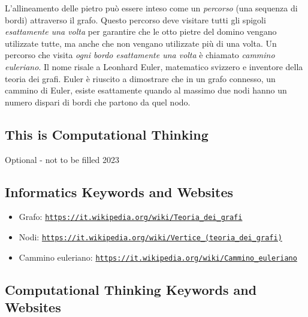 \documentclass[a4paper,11pt]{report}
\newcommand{\BrochureUrlText}[1]{\texttt{#1}}
\begin{document}
L’allineamento delle pietro può essere inteso come un \emph{percorso} (una sequenza di bordi) attraverso il grafo. Questo percorso deve visitare tutti gli spigoli \emph{esattamente una volta} per garantire che le otto pietre del domino vengano utilizzate tutte, ma anche che non vengano utilizzate più di una volta.  Un percorso che visita \emph{ogni bordo esattamente una volta} è chiamato \emph{cammino euleriano}. Il nome risale a Leonhard Euler, matematico svizzero e inventore della teoria dei grafi. Euler  è riuscito a dimostrare che in un grafo connesso, un cammino di Euler, esiste esattamente quando al massimo due nodi hanno un numero dispari di bordi che partono da quel nodo.


\subsection*{This is Computational Thinking}

Optional - not to be filled 2023


\subsection*{Informatics Keywords and Websites}

\begin{itemize}
  \item Grafo: \href{https://it.wikipedia.org/wiki/Teoria_dei_grafi}{\BrochureUrlText{https://it.wikipedia.org/wiki/Teoria\_dei\_grafi}}
  \item Nodi: \href{https://it.wikipedia.org/wiki/Vertice_(teoria_dei_grafi)}{\BrochureUrlText{https://it.wikipedia.org/wiki/Vertice\_(teoria\_dei\_grafi)}}
  \item Cammino euleriano: \href{https://it.wikipedia.org/wiki/Cammino_euleriano}{\BrochureUrlText{https://it.wikipedia.org/wiki/Cammino\_euleriano}}
\end{itemize}


\subsection*{Computational Thinking Keywords and Websites}
\end{document}
